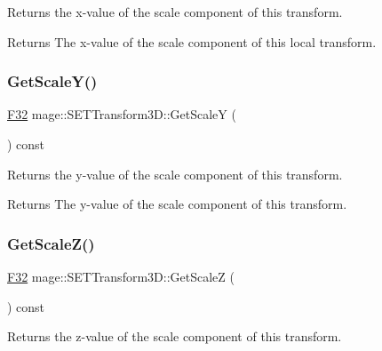 Returns the x-\/value of the scale component of this transform.

\begin{DoxyReturn}{Returns}
The x-\/value of the scale component of this local transform. 
\end{DoxyReturn}
\mbox{\label{classmage_1_1_s_e_t_transform3_d_a9192f398e72756d40b0352df43b9b4f1}} 
\subsubsection{\texorpdfstring{Get\+Scale\+Y()}{GetScaleY()}}
{\footnotesize\ttfamily \mbox{\hyperlink{namespacemage_aa97e833b45f06d60a0a9c4fc22ae02c0}{F32}} mage\+::\+S\+E\+T\+Transform3\+D\+::\+Get\+ScaleY (\begin{DoxyParamCaption}{ }\end{DoxyParamCaption}) const\hspace{0.3cm}{\ttfamily [noexcept]}}

Returns the y-\/value of the scale component of this transform.

\begin{DoxyReturn}{Returns}
The y-\/value of the scale component of this transform. 
\end{DoxyReturn}
\mbox{\label{classmage_1_1_s_e_t_transform3_d_acfe8a172bc51d80cac209a5892a677d3}} 
\subsubsection{\texorpdfstring{Get\+Scale\+Z()}{GetScaleZ()}}
{\footnotesize\ttfamily \mbox{\hyperlink{namespacemage_aa97e833b45f06d60a0a9c4fc22ae02c0}{F32}} mage\+::\+S\+E\+T\+Transform3\+D\+::\+Get\+ScaleZ (\begin{DoxyParamCaption}{ }\end{DoxyParamCaption}) const\hspace{0.3cm}{\ttfamily [noexcept]}}

Returns the z-\/value of the scale component of this transform.

